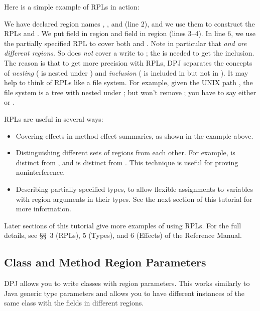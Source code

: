 Here is a simple example of RPLs in action:
%

%
We have declared region names , , and  (line 2),
and we use them to construct the RPLs  and .  We put
field  in region  and field  in region
 (lines 3--4).  In line 6, we use the partially specified RPL
 to cover both  and .  Note in particular
that \emph{ and  are different regions}.  So
 does \emph{not} cover a write to ; the \kwd{*}
is needed to get the inclusion.  The reason is that to get more
precision with RPLs, DPJ separates the concepts of \emph{nesting}
( is nested under ) and \emph{inclusion} ( is
included in  but not in ).  It may help to think of
RPLs like a file system.  For example, given the UNIX path
, the file system is a tree with  nested under
; but  won't remove ; you have to say
either  or .

RPLs are useful in several ways:
%
\begin{itemize}
%
\item Covering effects in method effect summaries, as shown in the
  example above.
%
\item Distinguishing different sets of regions from each other.  For
  example,  is distinct from , and  is
  distinct from .  This technique is useful for proving
  noninterference.
%
\item Describing partially specified types, to allow flexible
  assignments to variables with region arguments in their types.  See
  the next section of this tutorial for more information.
%
\end{itemize}
%
Later sections of this tutorial give more examples of using RPLs.  For
the full details, see \S\S~3 (RPLs), 5 (Types), and 6 (Effects) of the
Reference Manual.

\subsection{Class and Method Region Parameters%
\label{sec:overview:params}}

 DPJ allows you to write classes with
region parameters.  This works similarly to Java generic type
parameters and allows you to have different instances of the same
class with the fields in different regions.


